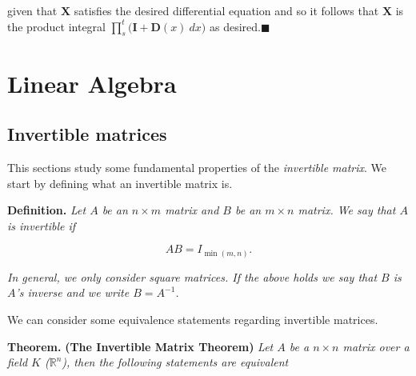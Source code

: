 \documentclass[
]{book}
\begin{document}
given that \(\mathbf{X}\) satisfies the desired differential equation and so it follows that \(\mathbf{X}\) is the product integral \(\prod_{s}^t\big(\mathbf{I}+\mathbf{D}(x)\ dx\big)\) as desired.\(\blacksquare\)

\hypertarget{linear-algebra}{%
\chapter{Linear Algebra}\label{linear-algebra}}

\hypertarget{invertible-matrices}{%
\section{Invertible matrices}\label{invertible-matrices}}

This sections study some fundamental properties of the \emph{invertible matrix}. We start by defining what an invertible matrix is.

\textbf{Definition.} \emph{Let \(A\) be an \(n\times m\) matrix and \(B\) be an \(m\times n\) matrix. We say that \(A\) is invertible if}

\[
AB=I_{\min(m,n)}.
\]

\emph{In general, we only consider square matrices. If the above holds we say that \(B\) is \(A\)'s inverse and we write \(B=A^{-1}\).}

We can consider some equivalence statements regarding invertible matrices.

\textbf{Theorem.} \textbf{(The Invertible Matrix Theorem)} \emph{Let \(A\) be a \(n\times n\) matrix over a field \(K\) (\(\mathbb{R}^n\)), then the following statements are equivalent}
\end{document}
